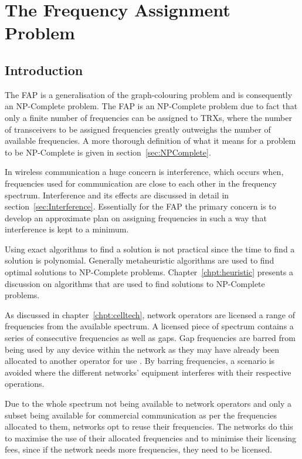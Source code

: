 \chapter{The Frequency Assignment Problem}
\label{chpt:fap}
\section{Introduction}
The \gls{FAP} is a generalisation of the graph-colouring problem and is consequently an NP-Complete problem\cite{FAPRAMColouring}. The \gls{FAP} is an NP-Complete problem due to fact that only a finite number of frequencies can be assigned to \glspl{TRX}, where the number of transceivers to be assigned frequencies greatly outweighs the number of available frequencies\cite{FAPRAMColouring}. A more thorough definition of what it means for a problem to be NP-Complete is given in section~\ref{sec:NPComplete}.

In wireless communication a huge concern is interference, which occurs when, frequencies used for communication are close to each other in the frequency spectrum\cite{Karen2004}. Interference and its effects are discussed in detail in section~\ref{sec:Interference}. Essentially for the \gls{FAP} the primary concern is to develop an approximate plan on assigning frequencies in such a way that interference is kept to a minimum. 

Using exact algorithms to find a solution is not practical since the time to find a solution is polynomial. Generally metaheuristic algorithms are used to find optimal solutions to NP-Complete problems\cite{ACOvsEA}. Chapter~\ref{chpt:heuristic} presents a discussion on algorithms that are used to find solutions to NP-Complete problems. 

As discussed in chapter~\ref{chpt:celltech}, network operators are licensed a range of frequencies from the available spectrum. A licensed piece of spectrum contains a series of consecutive frequencies as well as gaps. Gap frequencies are barred from being used by any device within the network as they may have already been allocated to another operator for use \cite{FAPInCell}. By barring frequencies, a scenario is avoided where the different networks' equipment interferes with their respective operations\cite{FAPInCell}.

Due to the whole spectrum not being available to network operators and only a subset being available for commercial communication as per the frequencies allocated to them, networks opt to reuse their frequencies\cite{FAPInCell}. The networks do this to maximise the use of their allocated frequencies and to minimise their licensing fees, since if the network needs more frequencies, they need to be licensed\cite{FAPRAMColouring}.

